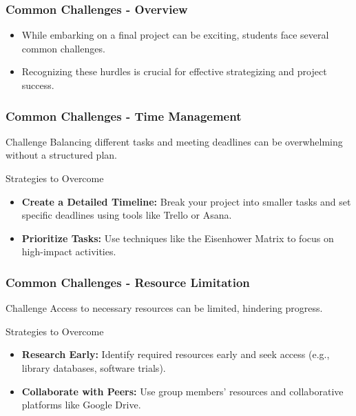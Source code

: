 \documentclass[aspectratio=169]{beamer}
\begin{document}
\begin{frame}[fragile]
    \frametitle{Common Challenges - Overview}
    \begin{itemize}
        \item While embarking on a final project can be exciting, students face several common challenges.
        \item Recognizing these hurdles is crucial for effective strategizing and project success.
    \end{itemize}
\end{frame}

\begin{frame}[fragile]
    \frametitle{Common Challenges - Time Management}
    \begin{block}{Challenge}
        Balancing different tasks and meeting deadlines can be overwhelming without a structured plan.
    \end{block}
    \begin{block}{Strategies to Overcome}
        \begin{itemize}
            \item \textbf{Create a Detailed Timeline:} Break your project into smaller tasks and set specific deadlines using tools like Trello or Asana.
            \item \textbf{Prioritize Tasks:} Use techniques like the Eisenhower Matrix to focus on high-impact activities.
        \end{itemize}
    \end{block}
\end{frame}

\begin{frame}[fragile]
    \frametitle{Common Challenges - Resource Limitation}
    \begin{block}{Challenge}
        Access to necessary resources can be limited, hindering progress.
    \end{block}
    \begin{block}{Strategies to Overcome}
        \begin{itemize}
            \item \textbf{Research Early:} Identify required resources early and seek access (e.g., library databases, software trials).
            \item \textbf{Collaborate with Peers:} Use group members' resources and collaborative platforms like Google Drive.
        \end{itemize}
    \end{block}
\end{frame}
\end{document}
